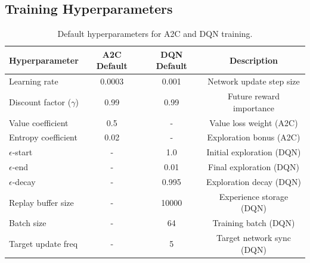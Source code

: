 \begin{center}
\end{center}

\subsection{Training Hyperparameters}

\begin{table}[h!]
\centering
\begin{tabular}{|l|c|c|c|}
\hline
\textbf{Hyperparameter} & \textbf{A2C Default} & \textbf{DQN Default} & \textbf{Description} \\
\hline
Learning rate & 0.0003 & 0.001 & Network update step size \\
Discount factor ($\gamma$) & 0.99 & 0.99 & Future reward importance \\
Value coefficient & 0.5 & - & Value loss weight (A2C) \\
Entropy coefficient & 0.02 & - & Exploration bonus (A2C) \\
$\epsilon$-start & - & 1.0 & Initial exploration (DQN) \\
$\epsilon$-end & - & 0.01 & Final exploration (DQN) \\
$\epsilon$-decay & - & 0.995 & Exploration decay (DQN) \\
Replay buffer size & - & 10000 & Experience storage (DQN) \\
Batch size & - & 64 & Training batch (DQN) \\
Target update freq & - & 5 & Target network sync (DQN) \\
\hline
\end{tabular}
\caption{Default hyperparameters for A2C and DQN training.}
\end{table}

